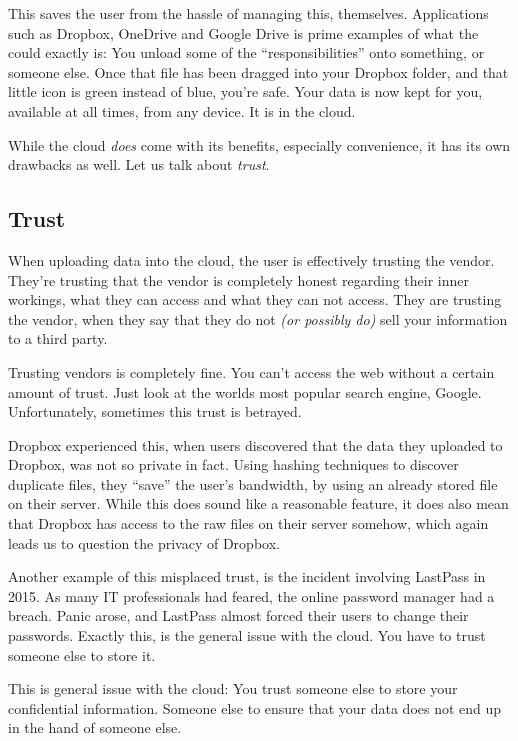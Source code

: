 		This saves the user from the hassle of managing this, themselves. Applications such as Dropbox, OneDrive and Google Drive is prime examples of what the could exactly is: You unload some of the ``responsibilities'' onto something, or someone else. Once that file has been dragged into your Dropbox folder, and that little icon is green instead of blue, you're safe. Your data is now kept for you, available at all times, from any device. It is in the cloud.

		While the cloud \emph{does} come with its benefits, especially convenience, it has its own drawbacks as well. Let us talk about \emph{trust}.

		\subsection*{Trust}
			When uploading data into the cloud, the user is effectively trusting the vendor. They're trusting that the vendor is completely honest regarding their inner workings, what they can access and what they can not access. They are trusting the vendor, when they say that they do not \emph{(or possibly do)} sell your information to a third party.

			Trusting vendors is completely fine. You can't access the web without a certain amount of trust. Just look at the worlds most popular search engine, Google. Unfortunately, sometimes this trust is betrayed.

			Dropbox experienced this, when users discovered that the data they uploaded to Dropbox, was not so private in fact. Using hashing techniques to discover duplicate files, they ``save'' the user's bandwidth, by using an already stored file on their server. While this does sound like a reasonable feature, it does also mean that Dropbox has access to the raw files on their server somehow, which again leads us to question the privacy of Dropbox.

			Another example of this misplaced trust, is the incident involving LastPass in 2015. As many IT professionals had feared, the online password manager had a breach. Panic arose, and LastPass almost forced their users to change their passwords. Exactly this, is the general issue with the cloud. You have to trust someone else to store it.


			This is general issue with the cloud: You trust someone else to store your confidential information. Someone else to ensure that your data does not end up in the hand of someone else.

